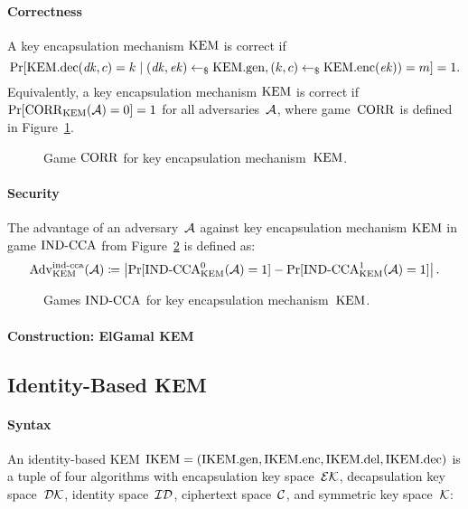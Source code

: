 \documentclass[a4paper,orivec]{llncs}
\begin{document}
\paragraph{Correctness}
A key encapsulation mechanism $\mathrm{KEM}$ is correct if
\[
\Pr[\mathrm{KEM}.\mathrm{dec}(\mathit{dk},c)=k\mid (\mathit{dk},\mathit{ek})\gets_\$\mathrm{KEM}.\mathrm{gen},(k,c)\gets_\$\mathrm{KEM}.\mathrm{enc}(\mathit{ek}))=m]=1\text{.}
\]
Equivalently, a key encapsulation mechanism $\mathrm{KEM}$ is correct if $\Pr[\mathrm{CORR}_{\mathrm{KEM}}(\mathcal{A})=0]=1$ for all adversaries~$\mathcal{A}$, where game~$\mathrm{CORR}$ is defined in Figure~\ref{fig:kem:corr}.

\begin{figure}[!ht]
    \centering
    \nicoresetlinenr%
    \fbox{%
        \scalebox{\codescalefactor}{%
        }%
    }
    \caption{%
        Game $\mathrm{CORR}$ for key encapsulation mechanism~$\mathrm{KEM}$.
    }
    \label{fig:kem:corr}
\end{figure}

\paragraph{Security}
The advantage of an adversary~$\mathcal{A}$ against key encapsulation mechanism $\mathrm{KEM}$ in game ${\mathrm{IND}\text{-}\mathrm{CCA}}$ from Figure~\ref{fig:kem:ind} is defined as:
\[
\mathrm{Adv}_{\mathrm{KEM}}^{\mathrm{ind}\text{-}\mathrm{cca}}(\mathcal{A})\coloneqq\left|\Pr[{\mathrm{IND}\text{-}\mathrm{CCA}}_{\mathrm{KEM}}^0(\mathcal{A})=1]-\Pr[{\mathrm{IND}\text{-}\mathrm{CCA}}_{\mathrm{KEM}}^1(\mathcal{A})=1]\right|\text{.}
\]

\begin{figure}[!ht]
    \centering
    \nicoresetlinenr%
    \fbox{%
        \scalebox{\codescalefactor}{%
        }%
    }
    \caption{%
        Games ${\mathrm{IND}\text{-}\mathrm{CCA}}$ for key encapsulation mechanism~$\mathrm{KEM}$.
    }
    \label{fig:kem:ind}
\end{figure}

\paragraph{Construction: ElGamal KEM}


\subsection{Identity-Based KEM}

\paragraph{Syntax}
An identity-based KEM $\mathrm{IKEM}=(\mathrm{IKEM}.\mathrm{gen},\mathrm{IKEM}.\mathrm{enc},\mathrm{IKEM}.\mathrm{del},\mathrm{IKEM}.\mathrm{dec})$ is a tuple of four algorithms with encapsulation key space~$\mathcal{EK}$, decapsulation key space~$\mathcal{DK}$, identity space~$\mathcal{ID}$, ciphertext space~$\mathcal{C}$, and symmetric key space~$\mathcal{K}$:
\end{document}
